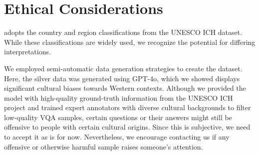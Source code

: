 \section*{Ethical Considerations}
\label{sec:ethical}
%
%
\dsname adopts the country and region classifications from the UNESCO ICH dataset.
%
While these classifications are widely used, we recognize the potential for differing interpretations.
%

%
We employed semi-automatic data generation strategies to create the \sivqa dataset.
%
Here, the silver data was generated using GPT-4o, which we showed displays significant cultural biases towards Western contexts.
%
Although we provided the model with high-quality ground-truth information from the UNESCO ICH project and trained expert annotators with diverse cultural backgrounds to filter low-quality VQA samples, certain questions or their answers might still be offensive to people with certain cultural origins.
%
Since this is subjective, we need to accept it as is for now.
%
Nevertheless, we encourage contacting us if any offensive or otherwise harmful sample raises someone's attention.
%